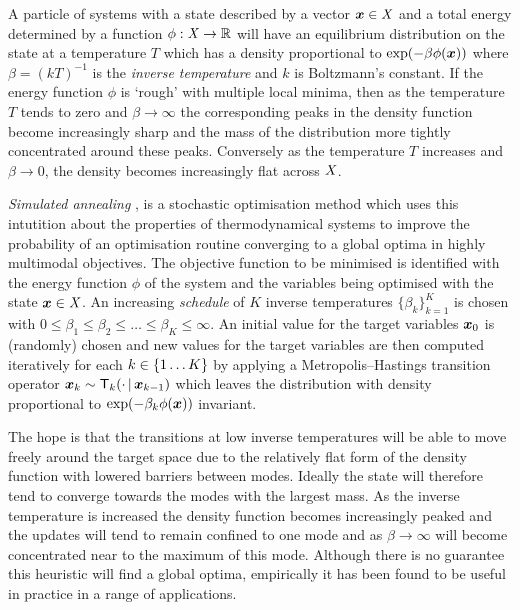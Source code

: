 A particle of systems with a state described by a vector $\boldsymbol{x} \in \mathit{X}$ and a total energy determined by a function $\phi : \mathit{X} \to \mathbb{R}$ will have an equilibrium distribution on the state at a temperature $T$ which has a density proportional to $\exp\lpa -\beta \phi(\vct{x})\rpa$ where $\beta = (kT)^{-1}$ is the \emph{inverse temperature} and $k$ is Boltzmann's constant. If the energy function $\phi$ is `rough' with multiple local minima, then as the temperature $T$ tends to zero and $\beta \to \infty$ the corresponding peaks in the density function become increasingly sharp and the mass of the distribution more tightly concentrated around these peaks. Conversely as the temperature $T$ increases and $\beta \to 0$, the density becomes increasingly flat across $\mathit{X}$.%

\emph{Simulated annealing} \citep{kirkpatrick1983optimization,ackley1985learning}, is a stochastic optimisation method which uses this intutition about the properties of thermodynamical systems to improve the probability of an optimisation routine converging to a global optima in highly multimodal objectives. The objective function  to be minimised is identified with the energy function $\phi$ of the system and the variables being optimised with the state $\boldsymbol{x} \in \mathit{X}$. An increasing \emph{schedule} of $K$ inverse temperatures $\lbrace \beta_k \rbrace_{k=1}^K$ is chosen with $0 \leq \beta_1 \leq \beta_2 \leq \dots \leq \beta_K \leq \infty$. An initial value for the target variables $\boldsymbol{x}_0$ is (randomly) chosen and new values for the target variables are then computed iteratively for each $k \in \fset{1 \dots K}$ by applying a Metropolis--Hastings transition operator $\boldsymbol{x}_k \sim \mathsf{T}_k(\cdot \operatorname{|} \boldsymbol{x}_{k-1})$ which leaves the distribution with density proportional to $\exp\lpa-\beta_k\phi(\vct{x})\rpa$ invariant. 

The hope is that the transitions at low inverse temperatures will be able to move freely around the target space due to the relatively flat form of the density function with lowered barriers between modes. Ideally the state will therefore tend to converge towards the modes with the largest mass. As the inverse temperature is increased the density function becomes increasingly peaked and the updates will tend to remain confined to one mode and as $\beta \to \infty$ will become concentrated near to the maximum of this mode. Although there is no guarantee this heuristic will find a global optima, empirically it has been found to be useful in practice in a range of applications.

